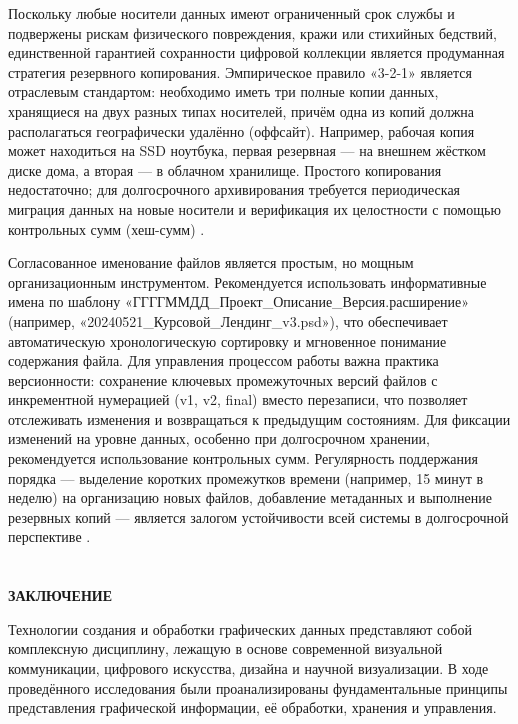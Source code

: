 \documentclass{SibFU-docs}
\begin{document}
Поскольку любые носители данных имеют ограниченный срок службы и подвержены рискам физического повреждения, кражи или стихийных бедствий, единственной гарантией сохранности цифровой коллекции является продуманная стратегия резервного копирования. Эмпирическое правило «3-2-1» является отраслевым стандартом: необходимо иметь три полные копии данных, хранящиеся на двух разных типах носителей, причём одна из копий должна располагаться географически удалённо (оффсайт). Например, рабочая копия может находиться на SSD ноутбука, первая резервная — на внешнем жёстком диске дома, а вторая — в облачном хранилище. Простого копирования недостаточно; для долгосрочного архивирования требуется периодическая миграция данных на новые носители и верификация их целостности с помощью контрольных сумм (хеш-сумм) \cite{oais_reference_model}.


Согласованное именование файлов является простым, но мощным организационным инструментом. Рекомендуется использовать информативные имена по шаблону «ГГГГММДД\_Проект\_Описание\_Версия.расширение» (например, «20240521\_Курсовой\_Лендинг\_v3.psd»), что обеспечивает автоматическую хронологическую сортировку и мгновенное понимание содержания файла. Для управления процессом работы важна практика версионности: сохранение ключевых промежуточных версий файлов с инкрементной нумерацией (v1, v2, final) вместо перезаписи, что позволяет отслеживать изменения и возвращаться к предыдущим состояниям. Для фиксации изменений на уровне данных, особенно при долгосрочном хранении, рекомендуется использование контрольных сумм. Регулярность поддержания порядка — выделение коротких промежутков времени (например, 15 минут в неделю) на организацию новых файлов, добавление метаданных и выполнение резервных копий — является залогом устойчивости всей системы в долгосрочной перспективе \cite{principles_archival_description}.

\newpage
\section*{}
\vspace*{-2.5em}
\begin{center}\textbf{ЗАКЛЮЧЕНИЕ}\end{center}
{}

Технологии создания и обработки графических данных представляют собой комплексную дисциплину, лежащую в основе современной визуальной коммуникации, цифрового искусства, дизайна и научной визуализации. В ходе проведённого исследования были проанализированы фундаментальные принципы представления графической информации, её обработки, хранения и управления.
\end{document}
